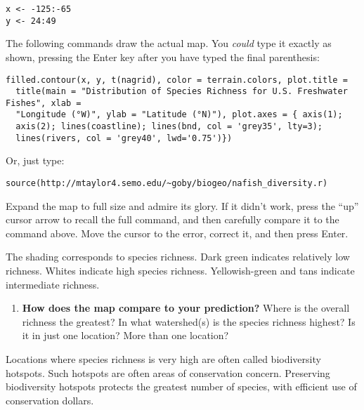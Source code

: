 \documentclass[11pt]{article}
\begin{document}
\begin{verbatim}
x <- -125:-65
y <- 24:49
\end{verbatim}

\newpage

The following commands draw the actual map. You \emph{could} type it exactly as
shown, pressing the Enter key after you have typed the final parenthesis:


\begin{verbatim}
filled.contour(x, y, t(nagrid), color = terrain.colors, plot.title =
  title(main = "Distribution of Species Richness for U.S. Freshwater Fishes", xlab =
  "Longitude (°W)", ylab = "Latitude (°N)"), plot.axes = { axis(1);
  axis(2); lines(coastline); lines(bnd, col = 'grey35', lty=3);
  lines(rivers, col = 'grey40', lwd='0.75')})
\end{verbatim}

Or, just type:

\begin{verbatim}
source(http://mtaylor4.semo.edu/~goby/biogeo/nafish_diversity.r)
\end{verbatim}

Expand the map to full size and admire its glory. If it didn't work, 
press the ``up'' cursor arrow to recall the full command, and then 
carefully compare it to the command above. Move the cursor to 
the error, correct it, and then press Enter.

The shading corresponds to species richness. Dark green indicates
relatively low richness. Whites indicate high species richness.
Yellowish-green and tans indicate intermediate richness.

\begin{enumerate}[resume, leftmargin=*]
\item \textbf{How does the map compare to your prediction?} Where is the overall
richness the greatest? In what watershed(s) is the species richness
highest? Is it in just one location? More than one location?\vspace{10\baselineskip}
\end{enumerate}

Locations where species richness is very high are often called
biodiversity hotspots. Such hotspots are often areas of conservation
concern. Preserving biodiversity hotspots protects the greatest number
of species, with efficient use of conservation dollars.
\end{document}
